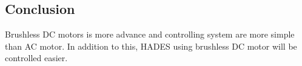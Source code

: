 
\subsection{Conclusion} 
Brushless DC motors is more advance and controlling system are more simple than AC motor. In addition to this, HADES using brushless DC motor will be controlled easier.
